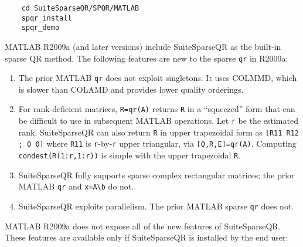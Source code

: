 \documentclass[12pt]{article}
\begin{document}
\begin{verbatim}
    cd SuiteSparseQR/SPQR/MATLAB
    spqr_install
    spqr_demo
\end{verbatim}

MATLAB R2009a (and later versions) include SuiteSparseQR as the built-in sparse
QR method.  The following features are new to the sparse \verb'qr' in R2009a:

\begin{enumerate}

    \item The prior MATLAB \verb'qr' does not exploit singletons.  It uses
    COLMMD, which is slower than COLAMD and provides lower quality orderings.

    \item For rank-deficient matrices, \verb'R=qr(A)' returns \verb'R' in a
    ``squeezed'' form that can be difficult to use in subsequent MATLAB
    operations.  Let \verb'r' be the estimated rank.  SuiteSparseQR can also
    return \verb'R' in upper trapezoidal form as \verb"[R11 R12 ; 0 0]" where
    \verb'R11' is \verb'r'-by-\verb'r' upper triangular, via
    \verb'[Q,R,E]=qr(A)'.  Computing \verb'condest(R(1:r,1:r))' is simple with
    the upper trapezoidal \verb'R'.

    \item SuiteSparseQR fully supports sparse complex rectangular matrices; the
    prior MATLAB \verb'qr' and \verb'x=A\b' do not.

    \item SuiteSparseQR exploits parallelism.  The prior
    MATLAB sparse \verb'qr' does not.

\end{enumerate}

MATLAB R2009a does not expose all of the new features of SuiteSparseQR.  These
features are available only if SuiteSparseQR is installed by the end user:
\end{document}
